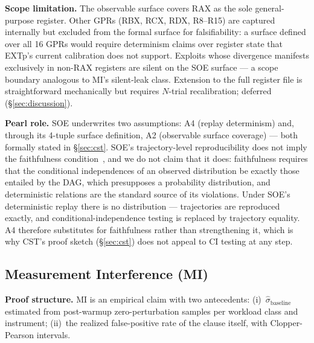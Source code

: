 \documentclass[conference]{IEEEtran}
\newcommand{\sigbase}{\hat{\sigma}_\text{baseline}}
\begin{document}
\textbf{Scope limitation.} The observable surface covers RAX as the
sole general-purpose register. Other GPRs (RBX, RCX, RDX, R8--R15)
are captured internally but excluded from the formal surface for
falsifiability: a surface defined over all 16 GPRs would require
determinism claims over register state that EXTp's current
calibration does not support. Exploits whose divergence manifests
exclusively in non-RAX registers are silent on the SOE surface ---
a scope boundary analogous to MI's silent-leak class. Extension to
the full register file is straightforward mechanically but requires
$N$-trial recalibration; deferred (\S\ref{sec:discussion}).

\textbf{Pearl role.} SOE underwrites two assumptions: A4 (replay
determinism) and, through its 4-tuple surface definition, A2
(observable surface coverage) --- both formally stated in
\S\ref{sec:cst}. SOE's trajectory-level reproducibility does not imply the
faithfulness condition~\cite{spirtes2000causation}, and we do not
claim that it does: faithfulness requires that the conditional
independences of an observed distribution be exactly those entailed
by the DAG, which presupposes a probability distribution, and
deterministic relations are the standard source of its violations.
Under SOE's deterministic replay there is no distribution ---
trajectories are reproduced exactly, and conditional-independence
testing is replaced by trajectory equality. A4 therefore substitutes
for faithfulness rather than strengthening it, which is why CST's
proof sketch (\S\ref{sec:cst}) does not appeal to CI testing at any
step.

\subsection{Measurement Interference (MI)}\label{sec:mi}

\textbf{Proof structure.} MI is an empirical claim with two
antecedents: (i)~$\sigbase$ estimated from post-warmup
zero-perturbation samples per workload class and instrument;
(ii)~the realized false-positive rate of the clause itself, with
Clopper-Pearson intervals.
\end{document}
